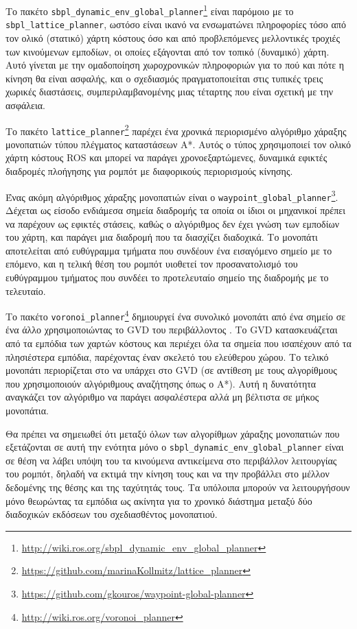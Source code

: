 Το πακέτο
\texttt{sbpl\_dynamic\_env\_global\_planner}\footnote{\url{http://wiki.ros.org/sbpl\_dynamic\_env\_global\_planner}\cite{Phillips2011}}
είναι παρόμοιο με το \texttt{sbpl\_lattice\_planner}, ωστόσο είναι ικανό να
ενσωματώνει πληροφορίες τόσο από τον ολικό (στατικό) χάρτη κόστους όσο και από
προβλεπόμενες μελλοντικές τροχιές των κινούμενων εμποδίων, οι οποίες εξάγονται
από τον τοπικό (δυναμικό) χάρτη. Αυτό γίνεται με την ομαδοποίηση χωροχρονικών
πληροφοριών για το πού και πότε η κίνηση θα είναι ασφαλής, και ο σχεδιασμός
πραγματοποιείται στις τυπικές τρεις χωρικές διαστάσεις, συμπεριλαμβανομένης
μιας τέταρτης που είναι σχετική με την ασφάλεια.

Το πακέτο
\texttt{lattice\_planner}\footnote{\url{https://github.com/marinaKollmitz/lattice\_planner}}
παρέχει ένα χρονικά περιορισμένο αλγόριθμο χάραξης μονοπατιών τύπου
πλέγματος καταστάσεων A*. Αυτός ο τύπος χρησιμοποιεί τον ολικό χάρτη κόστους
ROS και μπορεί να παράγει χρονοεξαρτώμενες, δυναμικά εφικτές διαδρομές
πλοήγησης για ρομπότ με διαφορικούς περιορισμούς κίνησης.

Ένας ακόμη αλγόριθμος χάραξης μονοπατιών είναι ο
\texttt{waypoint\_global\_planner}\footnote{\url{https://github.com/gkouros/waypoint-global-planner}}.
Δέχεται ως είσοδο ενδιάμεσα σημεία διαδρομής τα οποία οι ίδιοι οι μηχανικοί
πρέπει να παρέχουν ως εφικτές στάσεις, καθώς ο αλγόριθμος δεν έχει γνώση των
εμποδίων του χάρτη, και παράγει μια διαδρομή που τα διασχίζει διαδοχικά. Το
μονοπάτι αποτελείται από ευθύγραμμα τμήματα που συνδέουν ένα εισαγόμενο σημείο
με το επόμενο, και η τελική θέση του ρομπότ υιοθετεί τον προσανατολισμό του
ευθύγραμμου τμήματος που συνδέει το προτελευταίο σημείο της
διαδρομής με το τελευταίο.


Το πακέτο
\texttt{voronoi\_planner}\footnote{\url{http://wiki.ros.org/voronoi\_planner}}
δημιουργεί ένα συνολικό μονοπάτι από ένα σημείο σε ένα άλλο χρησιμοποιώντας το
GVD του περιβάλλοντος \cite{Bhattacharya2007}. Το GVD κατασκευάζεται από τα
εμπόδια των χαρτών κόστους και περιέχει όλα τα σημεία που ισαπέχουν από τα
πλησιέστερα εμπόδια, παρέχοντας έναν σκελετό του ελεύθερου χώρου. Το τελικό
μονοπάτι περιορίζεται στο να υπάρχει στο GVD (σε αντίθεση με τους αλγορίθμους
που χρησιμοποιούν αλγόριθμους αναζήτησης όπως ο A*). Αυτή η δυνατότητα
αναγκάζει τον αλγόριθμο να παράγει ασφαλέστερα αλλά μη βέλτιστα σε μήκος
μονοπάτια.

Θα πρέπει να σημειωθεί ότι μεταξύ όλων των αλγορίθμων χάραξης μονοπατιών που
εξετάζονται σε αυτή την ενότητα μόνο ο
\texttt{sbpl\_dynamic\_env\_global\_planner} είναι σε θέση να λάβει υπόψη του
τα κινούμενα αντικείμενα στο περιβάλλον λειτουργίας του ρομπότ, δηλαδή να
εκτιμά την κίνηση τους και να την προβάλλει στο μέλλον δεδομένης της θέσης και
της ταχύτητάς τους. Τα υπόλοιπα μπορούν να λειτουργήσουν μόνο θεωρώντας τα
εμπόδια ως ακίνητα για το χρονικό διάστημα μεταξύ δύο διαδοχικών εκδόσεων του
σχεδιασθέντος μονοπατιού.


